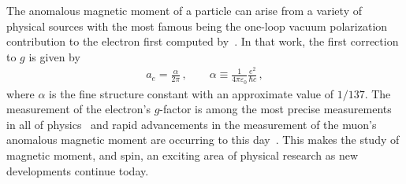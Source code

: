 The anomalous magnetic moment of a particle can arise from a variety of physical sources with the most famous being the one-loop vacuum polarization contribution to the electron first computed by~\cite{Schwinger:1951nm}. In that work, the first correction to $g$ is given by
\begin{gather}
    a_{e} = \frac{\alpha}{2\pi}\,,\qquad
    \alpha\equiv\frac{1}{4\pi\varepsilon_{0}}\frac{e^{2}}{\hbar c}\,,
\end{gather}
where $\alpha$ is the fine structure constant with an approximate value of $1/137$. The measurement of the electron's $g$-factor is among the most precise measurements in all of physics~\citep{Tiesinga:2021myr} and rapid advancements in the measurement of the muon's anomalous magnetic moment are occurring to this day~\citep{Muong-2:2023cdq}. This makes the study of magnetic moment, and spin, an exciting area of physical research as new developments continue today.

